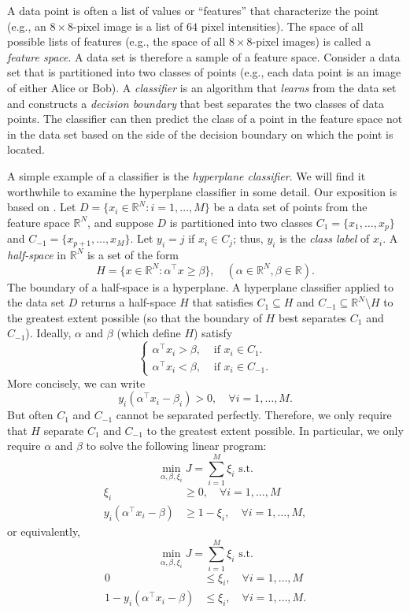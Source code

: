 \documentclass[12pt, a4paper, notitlepage]{report}
\newcommand{\RR}{\mathbb{R}}
\begin{document}
A data point is often a list of values or ``features'' that characterize the point (e.g., an $8\times 8$-pixel image is a list of $64$ pixel intensities). The space of all possible lists of features (e.g., the space of all $8\times 8$-pixel images) is called a \emph{feature space}. A data set is therefore a sample of a feature space. Consider a data set that is partitioned into two classes of points (e.g., each data point is an image of either Alice or Bob). A \emph{classifier} is an algorithm that \emph{learns} from the data set and constructs a \emph{decision boundary} that best separates the two classes of data points. The classifier can then predict the class of a point in the feature space not in the data set based on the side of the decision boundary on which the point is located.

A simple example of a classifier is the \emph{hyperplane classifier}. We will find it worthwhile to examine the hyperplane classifier in some detail. Our exposition is based on \cite{LBC}. Let $D = \{x_i\in\RR^N: i=1,\ldots,M\}$ be a data set of points from the feature space $\RR^N$, and suppose $D$ is partitioned into two classes $C_1 = \{x_1,\ldots,x_p\}$ and $C_{-1}=\{x_{p+1},\ldots,x_M\}$. Let $y_i=j$ if $x_i\in C_j$; thus, $y_i$ is the \emph{class label} of $x_i$. A \emph{half-space} in $\RR^N$ is a set of the form
\[ H = \{x\in\RR^N: \alpha^\top x\geq \beta\}, \quad
(\alpha\in\RR^N, \beta\in\RR). \]
The boundary of a half-space is a hyperplane. A hyperplane classifier applied to the data set $D$ returns a half-space $H$ that satisfies $C_1\subseteq H$ and $C_{-1}\subseteq\RR^N\setminus H$ to the greatest extent possible (so that the boundary of $H$ best separates $C_1$ and $C_{-1}$). Ideally, $\alpha$ and $\beta$ (which define $H$) satisfy
\[ \begin{cases}
\alpha^\top x_i > \beta, & \mbox{ if } x_i\in C_1. \\
\alpha^\top x_i < \beta, & \mbox{ if } x_i\in C_{-1}.
\end{cases} \]
More concisely, we can write
\[ y_i(\alpha^\top x_i-\beta_i) > 0, \quad\forall i=1,\ldots,M. \]
But often $C_1$ and $C_{-1}$ cannot be separated perfectly. Therefore, we only require that $H$ separate $C_1$ and $C_{-1}$ to the greatest extent possible. In particular, we only require $\alpha$ and $\beta$ to solve the following linear program:
\[ \min_{\alpha,\beta,\xi_i} J = \sum_{i=1}^M \xi_i \mbox{ s.t.} \]
\begin{align*}
\xi_i &\geq 0, \quad\forall i=1,\ldots,M \\
y_i(\alpha^\top x_i-\beta) &\geq 1-\xi_i, \quad\forall i=1,\ldots,M,
\end{align*}
or equivalently,
\[ \min_{\alpha,\beta,\xi_i} J = \sum_{i=1}^M \xi_i \mbox{ s.t.} \tag{LP1} \]
\begin{align*}
0 &\leq \xi_i, \quad\forall i=1,\ldots,M \\
1-y_i(\alpha^\top x_i-\beta) &\leq \xi_i, \quad\forall i=1,\ldots,M.
\end{align*}
\end{document}

